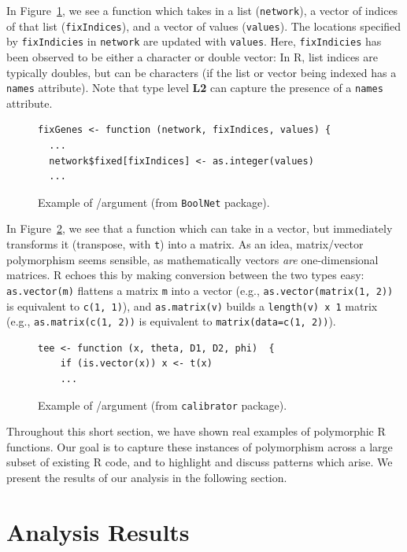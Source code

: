\documentclass[acmsmall,10pt,review,anonymous]{acmart}\settopmatter{printfolios=true,printccs=false,printacmref=false}
\newcommand{\code}[1]{\lstinline|#1|\xspace}
\begin{document}
In Figure~\ref{fig:chardbl}, we see a function which takes in a list ({\tt network}), a vector of indices of that list ({\tt fixIndices}), and a
vector of values ({\tt values}).  The locations specified by {\tt fixIndicies} in {\tt network} are updated with {\tt values}.  Here, {\tt fixIndicies} has been observed to be either a character or double vector:
In R, list indices are typically doubles, but can be characters (if the list
or vector being indexed has a {\tt names} attribute).
Note that type level {\bf L2} can capture the presence of a {\tt names} attribute.

\begin{figure}[!hb]{\small\begin{lstlisting}[style=R]
fixGenes <- function (network, fixIndices, values) {
  ...
  network$fixed[fixIndices] <- as.integer(values)
  ...
\end{lstlisting}}\caption{Example of \C/\D argument (from {\tt BoolNet} package).}\label{fig:chardbl}\end{figure}%

In Figure~\ref{fig:matvec}, we see that a function which can take in a vector,
but immediately transforms it (transpose, with {\tt t}) into a matrix.  As
an idea, matrix/vector polymorphism seems sensible, as mathematically
vectors {\it are} one-dimensional matrices.  R echoes this by making conversion between the two
types easy: \code{as.vector(m)} flattens a matrix \code{m} into a vector
(e.g., \code{as.vector(matrix(1, 2))} is equivalent to \code{c(1, 1)}), and
\code{as.matrix(v)} builds a {\tt length(v) x 1} matrix (e.g.,
\code{as.matrix(c(1, 2))} is equivalent to \code{matrix(data=c(1, 2))}). 
  
\begin{figure}[!hb]{\small\begin{lstlisting}[style=R]
tee <- function (x, theta, D1, D2, phi)  {
    if (is.vector(x)) x <- t(x)
    ...
\end{lstlisting}}\caption{Example of /\D argument (from {\tt calibrator} package).}\label{fig:matvec}\end{figure}

Throughout this short section, we have shown real examples of polymorphic R functions.
Our goal is to capture these instances of polymorphism across a large subset of existing R code, and to highlight and discuss patterns which arise.
We present the results of our analysis in the following section.

%
%
%
%
%
%
\section{Analysis Results}\label{sec:results}
\end{document}
